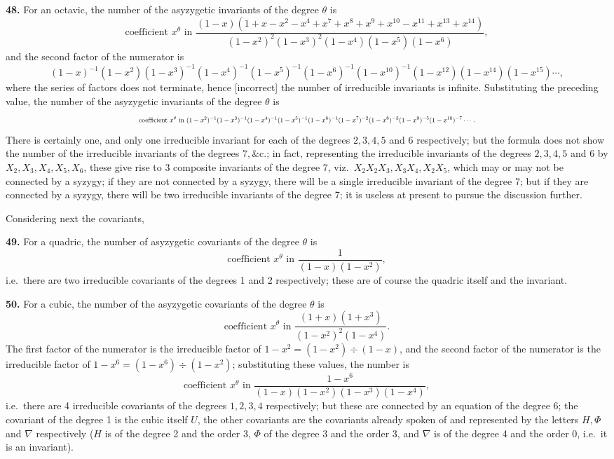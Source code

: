 \documentclass[11pt]{article}
\begin{document}
\textbf{48.} For an octavic, the number of the asyzygetic invariants of the degree $\theta$ is
\[
\text{coefficient } x^\theta \text{ in } \frac{(1 - x)(1 + x - x^2 - x^4 + x^7 + x^8 + x^9 + x^{10} - x^{11} + x^{13} + x^{14})}{(1 - x^2)^2(1 - x^3)^2(1 - x^4)(1 - x^5)(1 - x^6)},
\]
and the second factor of the numerator is
\[
(1 - x)^{-1}(1 - x^2)(1 - x^3)^{-1}(1 - x^4)^{-1}(1 - x^5)^{-1}(1 - x^6)^{-1}(1 - x^{10})^{-1}(1 - x^{12})(1 - x^{14})(1 - x^{15})\cdots,
\]
where the series of factors does not terminate, hence [incorrect] the number of irreducible invariants is infinite. Substituting the preceding value, the number of the asyzygetic invariants of the degree $\theta$ is
\[ \resizebox{\textwidth}{!}{$\displaystyle
\text{coefficient } x^\theta \text{ in } (1 - x^2)^{-1}(1 - x^3)^{-1}(1 - x^4)^{-1}(1 - x^5)^{-1}(1 - x^6)^{-1}(1 - x^7)^{-2}(1 - x^8)^{-3}(1 - x^9)^{-5}(1 - x^{10})^{-7}\cdots.
$} \]
There is certainly one, and only one irreducible invariant for each of the degrees $2, 3, 4, 5$ and $6$ respectively; but the formula does not show the number of the irreducible invariants of the degrees $7, \&\text{c.}$; in fact, representing the irreducible invariants of the degrees $2, 3, 4, 5$ and $6$ by $X_2, X_3, X_4, X_5, X_6$, these give rise to 3 composite invariants of the degree 7, viz.\ $X_2 X_2 X_3, X_3 X_4, X_2 X_5$, which may or may not be connected by a syzygy; if they are not connected by a syzygy, there will be a single irreducible invariant of the degree 7; but if they are connected by a syzygy, there will be two irreducible invariants of the degree 7; it is useless at present to pursue the discussion further.

Considering next the covariants,

\textbf{49.} For a quadric, the number of asyzygetic covariants of the degree $\theta$ is
\[
\text{coefficient } x^\theta \text{ in } \frac{1}{(1 - x)(1 - x^2)},
\]
i.e.\ there are two irreducible covariants of the degrees 1 and 2 respectively; these are of course the quadric itself and the invariant.

\textbf{50.} For a cubic, the number of the asyzygetic covariants of the degree $\theta$ is
\[
\text{coefficient } x^\theta \text{ in } \frac{(1 + x)(1 + x^3)}{(1 - x^2)^2(1 - x^4)}.
\]
The first factor of the numerator is the irreducible factor of $1 - x^2 = (1 - x^2) \div (1 - x)$, and the second factor of the numerator is the irreducible factor of $1 - x^6 = (1 - x^6) \div (1 - x^2)$; substituting these values, the number is
\[
\text{coefficient } x^\theta \text{ in } \frac{1 - x^6}{(1 - x)(1 - x^2)(1 - x^3)(1 - x^4)},
\]
i.e.\ there are 4 irreducible covariants of the degrees $1, 2, 3, 4$ respectively; but these are connected by an equation of the degree 6; the covariant of the degree 1 is the cubic itself $U$, the other covariants are the covariants already spoken of and represented by the letters $H, \Phi$ and $\nabla$ respectively ($H$ is of the degree 2 and the order 3, $\Phi$ of the degree 3 and the order 3, and $\nabla$ is of the degree 4 and the order 0, i.e.\ it is an invariant).
\end{document}
